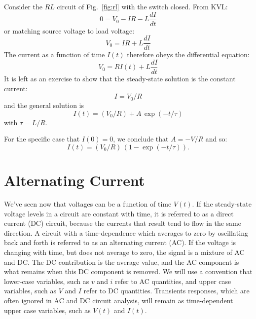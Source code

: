 \documentclass[12pt,oneside]{book}
\begin{document}
Consider the $RL$ circuit of Fig.~\ref{fig:rl} with the switch closed.  From KVL:
\begin{displaymath}
0 = V_0 - IR - L\frac{dI}{dt}
\end{displaymath}
or matching source voltage to load voltage:
\begin{displaymath}
V_0 = IR + L\frac{dI}{dt}
\end{displaymath}
The current as a function of time $I(t)$ therefore obeys the differential equation:
\begin{equation} 
V_0 = R I(t) + L \frac{dI}{dt}
\end{equation}
It is left as an exercise to show that the steady-state solution is the constant current:
\begin{equation} \label{eqn:inductorss}
I = V_0 / R
\end{equation}
and the general solution is 
\begin{equation} \label{eqn:inductorgen}
I(t) = (V_0 / R) + A \, \exp(-t/\tau) 
\end{equation}
with $\tau = L / R$.

For the specific case that $I(0) = 0$, we conclude that $A = -V/R$ and so:
\begin{displaymath}
I(t) = (V_0/R) \, (1 - \exp(-t / \tau)).
\end{displaymath}


\section{Alternating Current}


 We've seen now that voltages can be a function of time $V(t)$.    If the steady-state voltage levels in a circuit are constant with time, it is referred to as a direct current (DC) circuit, because the currents that result tend to flow in the same direction.   A circuit with a time-dependence which averages to zero by oscillating back and forth is referred to as an alternating current (AC).   If the voltage is changing with time, but does not average to zero, the signal is a mixture of AC and DC.  The DC contribution is the average value, and the AC component is what remains when this DC component is removed.  We will use a convention that lower-case variables, such as $v$ and $i$ refer to AC quantities, and upper case variables, such as $V$ and $I$ refer to DC quantities.  Transients responses, which are often ignored in AC and DC circuit analysis, will remain as time-dependent upper case variables, such as $V(t)$ and $I(t)$.
   
\end{document}
